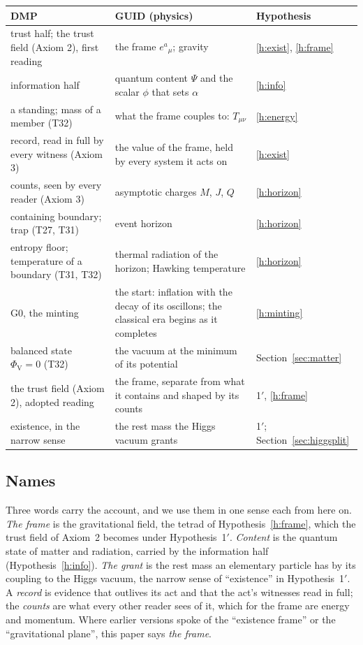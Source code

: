 \begin{center}\small
\begin{tabularx}{\linewidth}{@{}lLL@{}}
\toprule
DMP & GUID (physics) & Hypothesis \\
\midrule
trust half; the trust field (Axiom 2), first reading & the frame $e^a{}_\mu$; gravity & \ref{h:exist}, \ref{h:frame} \\
information half & quantum content $\Psi$ and the scalar $\phi$ that sets $\alpha$ & \ref{h:info} \\
a standing; mass of a member (T32) & what the frame couples to: $T_{\mu\nu}$ & \ref{h:energy} \\
record, read in full by every witness (Axiom 3) & the value of the frame, held by every system it acts on & \ref{h:exist} \\
counts, seen by every reader (Axiom 3) & asymptotic charges $M$, $J$, $Q$ & \ref{h:horizon} \\
containing boundary; trap (T27, T31) & event horizon & \ref{h:horizon} \\
entropy floor; temperature of a boundary (T31, T32) & thermal radiation of the horizon; Hawking temperature & \ref{h:horizon} \\
G0, the minting & the start: inflation with the decay of its oscillons; the classical era begins as it completes & \ref{h:minting} \\
balanced state $\Phi_{\mathrm V}=0$ (T32) & the vacuum at the minimum of its potential & Section~\ref{sec:matter} \\
the trust field (Axiom 2), adopted reading & the frame, separate from what it contains and shaped by
its counts & 1$'$, \ref{h:frame} \\
existence, in the narrow sense & the rest mass the Higgs vacuum grants & 1$'$; Section~\ref{sec:higgsplit} \\
\bottomrule
\end{tabularx}
\end{center}

\subsection{Names}

Three words carry the account, and we use them in one sense each from here on. \emph{The frame} is the gravitational field, the tetrad
of Hypothesis~\ref{h:frame}, which the trust field of Axiom~2 becomes under Hypothesis~1$'$. \emph{Content} is the quantum state of matter
and radiation, carried by the information half (Hypothesis~\ref{h:info}). \emph{The grant} is the rest mass an elementary particle has by
its coupling to the Higgs vacuum, the narrow sense of ``existence'' in Hypothesis~1$'$. A \emph{record} is evidence that outlives its act
and that the act's witnesses read in full; the \emph{counts} are what every other reader sees of it, which for the frame are energy and
momentum. Where earlier versions spoke of the ``existence frame'' or the ``gravitational plane'', this paper says \emph{the frame}.
